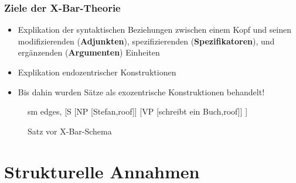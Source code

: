 \begin{frame}
\frametitle{Ziele der X-Bar-Theorie}

\begin{itemize}
	\item Explikation der syntaktischen Beziehungen zwischen einem Kopf und seinen modifizierenden (\textbf{Adjunkten}), spezifizierenden (\textbf{Spezifikatoren}), und ergänzenden (\textbf{Argumenten}) Einheiten
	\item Explikation endozentrischer Konstruktionen
	\item Bis dahin wurden Sätze als exozentrische Konstruktionen behandelt!
\end{itemize}

\begin{figure}[b]
	\begin{minipage}[b]{0.05\textwidth}
	\end{minipage} 
	\begin{minipage}[b]{0.50\textwidth}
	\centering
	\footnotesize{
		\begin{forest}
		sm edges,
		[S	[NP [Stefan,roof]]
			[VP [schreibt ein Buch,roof]]
		]
		\end{forest}
		}
		\caption{Satz vor X-Bar-Schema}	
  	\end{minipage}  
	\begin{minipage}[b]{0.05\textwidth}
  	\end{minipage}
  	
\end{figure}

\end{frame}


\section{Strukturelle Annahmen}

